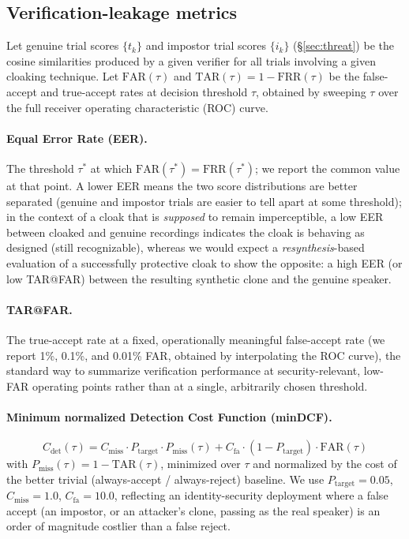 \documentclass[11pt]{article}
\begin{document}
\subsection{Verification-leakage metrics}

Let genuine trial scores $\{t_k\}$ and impostor trial scores $\{i_k\}$
(\S\ref{sec:threat}) be the cosine similarities produced by a given
verifier for all trials involving a given cloaking technique. Let
$\mathrm{FAR}(\tau)$ and $\mathrm{TAR}(\tau) = 1-\mathrm{FRR}(\tau)$ be
the false-accept and true-accept rates at decision threshold $\tau$,
obtained by sweeping $\tau$ over the full receiver operating
characteristic (ROC) curve.

\paragraph{Equal Error Rate (EER).} The threshold $\tau^\ast$ at which
$\mathrm{FAR}(\tau^\ast) = \mathrm{FRR}(\tau^\ast)$; we report the
common value at that point. A lower EER means the two score
distributions are better separated (genuine and impostor trials are
easier to tell apart at some threshold); in the context of a cloak
that is \emph{supposed} to remain imperceptible, a low EER between
cloaked and genuine recordings indicates the cloak is behaving as
designed (still recognizable), whereas we would expect a
\emph{resynthesis}-based evaluation of a successfully protective
cloak to show the opposite: a high EER (or low TAR@FAR) between the
resulting synthetic clone and the genuine speaker.

\paragraph{TAR@FAR.} The true-accept rate at a fixed, operationally
meaningful false-accept rate (we report 1\%, 0.1\%, and 0.01\% FAR,
obtained by interpolating the ROC curve), the standard way to
summarize verification performance at security-relevant, low-FAR
operating points rather than at a single, arbitrarily chosen
threshold.

\paragraph{Minimum normalized Detection Cost Function (minDCF).}
\begin{equation}
C_{\mathrm{det}}(\tau) = C_{\mathrm{miss}} \cdot P_{\mathrm{target}} \cdot P_{\mathrm{miss}}(\tau)
  + C_{\mathrm{fa}} \cdot (1 - P_{\mathrm{target}}) \cdot \mathrm{FAR}(\tau)
\end{equation}
with $P_{\mathrm{miss}}(\tau) = 1 - \mathrm{TAR}(\tau)$, minimized over
$\tau$ and normalized by the cost of the better trivial
(always-accept / always-reject) baseline. We use
$P_{\mathrm{target}}=0.05$, $C_{\mathrm{miss}}=1.0$,
$C_{\mathrm{fa}}=10.0$, reflecting an identity-security deployment
where a false accept (an impostor, or an attacker's clone, passing as
the real speaker) is an order of magnitude costlier than a false
reject.
\end{document}
